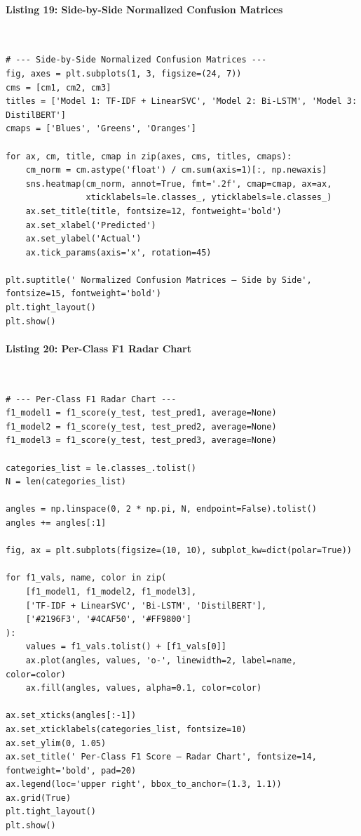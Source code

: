 \documentclass[12pt,a4paper,oneside]{report}
\begin{document}
\paragraph{Listing 19: Side-by-Side Normalized Confusion Matrices}\mbox{}\\[-1ex]
\begin{Verbatim}[commandchars=\\\{\},breaklines=true,breakanywhere=true,fontsize=\scriptsize,frame=leftline,framesep=2mm,rulecolor=\color{gray}]
# --- Side-by-Side Normalized Confusion Matrices ---
fig, axes = plt.subplots(1, 3, figsize=(24, 7))
cms = [cm1, cm2, cm3]
titles = ['Model 1: TF-IDF + LinearSVC', 'Model 2: Bi-LSTM', 'Model 3: DistilBERT']
cmaps = ['Blues', 'Greens', 'Oranges']

for ax, cm, title, cmap in zip(axes, cms, titles, cmaps):
    cm_norm = cm.astype('float') / cm.sum(axis=1)[:, np.newaxis]
    sns.heatmap(cm_norm, annot=True, fmt='.2f', cmap=cmap, ax=ax,
                xticklabels=le.classes_, yticklabels=le.classes_)
    ax.set_title(title, fontsize=12, fontweight='bold')
    ax.set_xlabel('Predicted')
    ax.set_ylabel('Actual')
    ax.tick_params(axis='x', rotation=45)

plt.suptitle(' Normalized Confusion Matrices — Side by Side', fontsize=15, fontweight='bold')
plt.tight_layout()
plt.show()
\end{Verbatim}
\paragraph{Listing 20: Per-Class F1 Radar Chart}\mbox{}\\[-1ex]
\begin{Verbatim}[commandchars=\\\{\},breaklines=true,breakanywhere=true,fontsize=\scriptsize,frame=leftline,framesep=2mm,rulecolor=\color{gray}]
# --- Per-Class F1 Radar Chart ---
f1_model1 = f1_score(y_test, test_pred1, average=None)
f1_model2 = f1_score(y_test, test_pred2, average=None)
f1_model3 = f1_score(y_test, test_pred3, average=None)

categories_list = le.classes_.tolist()
N = len(categories_list)

angles = np.linspace(0, 2 * np.pi, N, endpoint=False).tolist()
angles += angles[:1]

fig, ax = plt.subplots(figsize=(10, 10), subplot_kw=dict(polar=True))

for f1_vals, name, color in zip(
    [f1_model1, f1_model2, f1_model3],
    ['TF-IDF + LinearSVC', 'Bi-LSTM', 'DistilBERT'],
    ['#2196F3', '#4CAF50', '#FF9800']
):
    values = f1_vals.tolist() + [f1_vals[0]]
    ax.plot(angles, values, 'o-', linewidth=2, label=name, color=color)
    ax.fill(angles, values, alpha=0.1, color=color)

ax.set_xticks(angles[:-1])
ax.set_xticklabels(categories_list, fontsize=10)
ax.set_ylim(0, 1.05)
ax.set_title(' Per-Class F1 Score — Radar Chart', fontsize=14, fontweight='bold', pad=20)
ax.legend(loc='upper right', bbox_to_anchor=(1.3, 1.1))
ax.grid(True)
plt.tight_layout()
plt.show()
\end{Verbatim}
\end{document}
